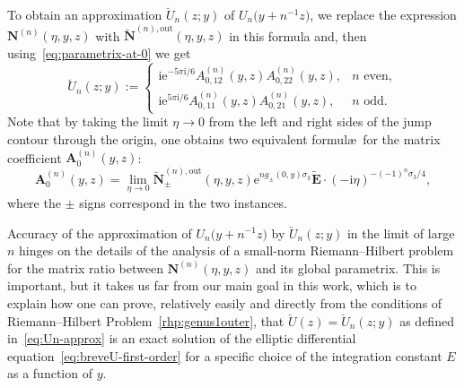 \documentclass[pdftex]{sigma}
\numberwithin{equation}{section}
\begin{document}
To obtain an approximation $\breve{U}_n(z;y)$ of $U_n\bigl(y+n^{-1}z\bigr)$, we replace
the expression $\mathbf{N}^{(n)}(\eta,y,z)$ with $\breve{\mathbf{N}}^{(n),\mathrm{out}}(\eta,y,z)$ in this formula and, then using~\eqref{eq:parametrix-at-0} we get
\begin{equation}
\breve{U}_n(z;y):=\begin{cases}\mathrm{i}\mathrm{e}^{-5\pi\mathrm{i}/6}A^{(n)}_{0,12}(y,z)A^{(n)}_{0,22}(y,z),&\text{$n$ even},\\\mathrm{i}\mathrm{e}^{5\pi\mathrm{i}/6}A^{(n)}_{0,11}(y,z)A^{(n)}_{0,21}(y,z),&\text{$n$ odd}.\end{cases}
\label{eq:Un-approx}
\end{equation}
Note that by taking the limit $\eta\to 0$ from the left and right sides of the jump contour through the origin, one obtains two equivalent formul\ae\ for the matrix coefficient $\mathbf{A}^{(n)}_0(y,z)$:
\begin{equation*}
\mathbf{A}^{(n)}_0(y,z)=\lim_{\eta\to 0}\breve{\mathbf{N}}^{(n),\mathrm{out}}_\pm(\eta,y,z)\mathrm{e}^{ng_\pm(0,y)\sigma_3}\widetilde{\mathbf{E}}\cdot (-\mathrm{i}\eta)^{-(-1)^n\sigma_3/4},
\end{equation*}
where the $\pm$ signs correspond in the two instances.

Accuracy of the approximation of $U_n\bigl(y+n^{-1}z\bigr)$ by $\breve{U}_n(z;y)$ in the limit of large $n$ hinges on the details of the analysis of a small-norm Riemann--Hilbert problem for the matrix ratio between $\mathbf{N}^{(n)}(\eta,y,z)$ and its global parametrix. This is important, but it takes us far from our main goal in this work, which is to explain how one can prove, relatively easily and directly from the conditions of Riemann--Hilbert Problem~\ref{rhp:genus1outer}, that $\breve{U}(z)=\breve{U}_n(z;y)$ as defined in~\eqref{eq:Un-approx} is an exact solution of the elliptic differential equation~\eqref{eq:breveU-first-order} for a specific choice of the integration constant $E$ as a function of $y$.
\end{document}
